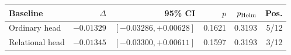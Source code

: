 \begin{tabular}{lrrrrr}
\toprule
Baseline & $\Delta$ & 95\% CI & $p$ & $p_{\rm Holm}$ & Pos. \\
\midrule
Ordinary head & $-0.01329$ & $[-0.03286,+0.00628]$ & 0.1621 & 0.3193 & 5/12 \\
Relational head & $-0.01345$ & $[-0.03300,+0.00611]$ & 0.1597 & 0.3193 & 3/12 \\
\bottomrule
\end{tabular}
